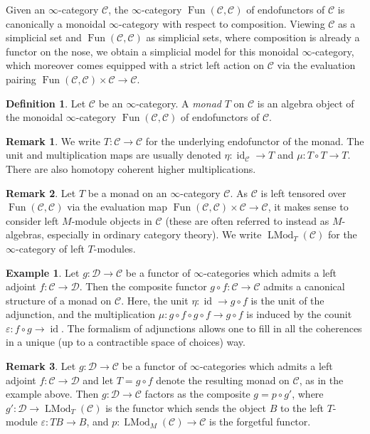 \documentclass{article}
\theoremstyle{definition}
\newtheorem{definition}{Definition}[subsection]
\newtheorem{example}{Example}[subsection]
\newtheorem{remark}{Remark}[subsection]
\newcommand{\C}{\mathcal{C}}
\newcommand{\D}{\mathcal{D}}
\renewcommand{\i}{\infty}
\DeclareMathOperator{\LMod}{LMod}
\DeclareMathOperator{\Fun}{Fun}
\DeclareMathOperator{\id}{id}
\renewcommand{\epsilon}{\varepsilon}
\begin{document}
Given an $\infty$-category $\C$, the $\infty$-category $\Fun(\C,\C)$ of endofunctors of $\C$ is canonically a monoidal $\infty$-category with respect to composition.
Viewing $\C$ as a simplicial set and $\Fun(\C,\C)$ as simplicial sets, where composition is already a functor on the nose, we obtain a simplicial model for this monoidal $\infty$-category, which moreover comes equipped with a strict left action on $\C$ via the evaluation pairing $\Fun(\C,\C)\times\C\to\C$.
\begin{definition}
Let $\C$ be an $\infty$-category.
A {\em monad} $T$ on $\C$ is an algebra object of the monoidal $\i$-category $\Fun(\C,\C)$ of endofunctors of $\C$.
\end{definition}
\begin{remark}
We write $T:\C\to\C$ for the underlying endofunctor of the monad.
The unit and multiplication maps are usually denoted $\eta:\id_\C\to T$ and $\mu:T\circ T\to T$. There are also homotopy coherent higher multiplications.
\end{remark}
\begin{remark}
Let $T$ be a monad on an $\infty$-category $\C$.
As $\C$ is left tensored over $\Fun(\C,\C)$ via the evaluation map $\Fun(\C,\C)\times\C\to\C$, it makes sense to consider left $M$-module objects in $\C$ (these are often referred to instead as $M$-algebras, especially in ordinary category theory).
We write $\LMod_T(\C)$ for the $\infty$-category of left $T$-modules.
\end{remark}

\begin{example}
Let $g:\D\to\C$ be a functor of $\infty$-categories which admits a left adjoint $f:\C\to\D$. Then the composite functor $g\circ f:\C\to\C$ admits a canonical structure of a monad on $\C$.
Here, the unit $\eta:\id\to g\circ f$ is the unit of the adjunction, and the multiplication $\mu:g\circ f\circ g\circ f\to g\circ f$ is induced by the counit $\epsilon:f\circ g\to\id$.
The formalism of adjunctions allows one to fill in all the coherences in a unique (up to a contractible space of choices) way.
\end{example}

\begin{remark}
Let $g:\D\to\C$ be a functor of $\infty$-categories which admits a left adjoint $f:\C\to\D$ and let $T=g\circ f$ denote the resulting monad on $\C$, as in the example above.
Then $g:\D\to\C$ factors as the composite $g=p\circ g'$, where $g':\D\to\LMod_{T}(\C)$ is the functor which sends the object $B$ to the left $T$-module $\epsilon:TB\to B$,
and $p:\LMod_{M}(\C)\to\C$ is the forgetful functor.
\end{remark}
\end{document}
